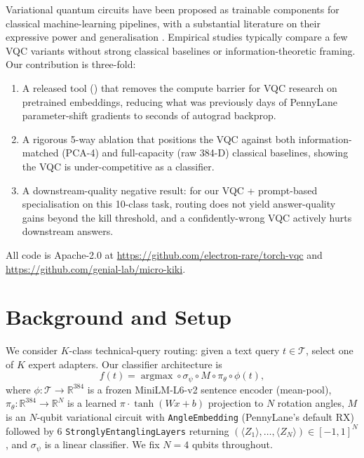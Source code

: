 Variational quantum circuits have been proposed as trainable components for classical machine-learning pipelines, with a substantial literature on their expressive power \citep{du2020expressive,abbas2021effective} and generalisation \citep{caro2022generalization}. Empirical studies typically compare a few VQC variants without strong classical baselines or information-theoretic framing. Our contribution is three-fold:

\begin{enumerate}
\item A released tool (\torchvqc) that removes the compute barrier for VQC research on pretrained embeddings, reducing what was previously days of PennyLane parameter-shift gradients to seconds of autograd backprop.
\item A rigorous 5-way ablation that positions the VQC against both information-matched (PCA-4) and full-capacity (raw 384-D) classical baselines, showing the VQC is under-competitive as a classifier.
\item A downstream-quality negative result: for our VQC + prompt-based specialisation on this 10-class task, routing does not yield answer-quality gains beyond the kill threshold, and a confidently-wrong VQC actively hurts downstream answers.
\end{enumerate}

All code is Apache-2.0 at \url{https://github.com/electron-rare/torch-vqc} and \url{https://github.com/genial-lab/micro-kiki}.

\section{Background and Setup}\label{sec:setup}

We consider $K$-class technical-query routing: given a text query $t \in \mathcal{T}$, select one of $K$ expert adapters. Our classifier architecture is
\begin{equation}
f(t) = \mathop{\arg\max} \circ \sigma_\psi \circ M \circ \pi_\theta \circ \phi(t),
\end{equation}
where $\phi : \mathcal{T} \to \mathbb{R}^{384}$ is a frozen MiniLM-L6-v2 sentence encoder (mean-pool), $\pi_\theta : \mathbb{R}^{384} \to \mathbb{R}^N$ is a learned $\pi \cdot \tanh(Wx+b)$ projection to $N$ rotation angles, $M$ is an $N$-qubit variational circuit with \texttt{AngleEmbedding} (PennyLane's default RX) followed by 6 \texttt{StronglyEntanglingLayers} returning $(\langle Z_1 \rangle, \ldots, \langle Z_N \rangle) \in [-1,1]^N$, and $\sigma_\psi$ is a linear classifier. We fix $N = 4$ qubits throughout.

